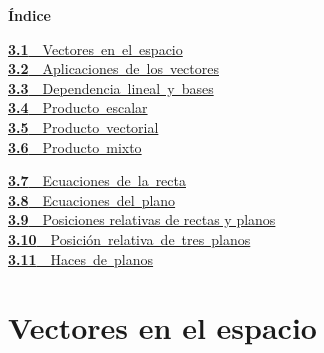 \documentclass[11pt,a4paper]{article}
\begin{document}
\begin{tcolorbox}[colback=fmsurface,colframe=fmsurface,arc=3mm,left=4mm,right=4mm,top=2mm,bottom=2mm]
\small\textbf{Índice}\par\smallskip
\begin{minipage}[t]{0.49\linewidth}\small \mbox{\hyperlink{sec1}{\textbf{\color{fmgreen}3.1}\ \ Vectores en el espacio}}\\[3pt]
\mbox{\hyperlink{sec2}{\textbf{\color{fmgreen}3.2}\ \ Aplicaciones de los vectores}}\\[3pt]
\mbox{\hyperlink{sec3}{\textbf{\color{fmgreen}3.3}\ \ Dependencia lineal y bases}}\\[3pt]
\mbox{\hyperlink{sec4}{\textbf{\color{fmgreen}3.4}\ \ Producto escalar}}\\[3pt]
\mbox{\hyperlink{sec5}{\textbf{\color{fmgreen}3.5}\ \ Producto vectorial}}\\[3pt]
\mbox{\hyperlink{sec6}{\textbf{\color{fmgreen}3.6}\ \ Producto mixto}}\\[3pt]\end{minipage}\hfill\begin{minipage}[t]{0.49\linewidth}\small \mbox{\hyperlink{sec7}{\textbf{\color{fmgreen}3.7}\ \ Ecuaciones de la recta}}\\[3pt]
\mbox{\hyperlink{sec8}{\textbf{\color{fmgreen}3.8}\ \ Ecuaciones del plano}}\\[3pt]
\hyperlink{sec9}{\textbf{\color{fmgreen}3.9}\ \ Posiciones relativas de rectas y planos}\\[3pt]
\mbox{\hyperlink{sec10}{\textbf{\color{fmgreen}3.10}\ \ Posición relativa de tres planos}}\\[3pt]
\mbox{\hyperlink{sec11}{\textbf{\color{fmgreen}3.11}\ \ Haces de planos}}\\[3pt]\end{minipage}
\end{tcolorbox}

\section{Vectores en el espacio}\hypertarget{sec1}{}
\end{document}
